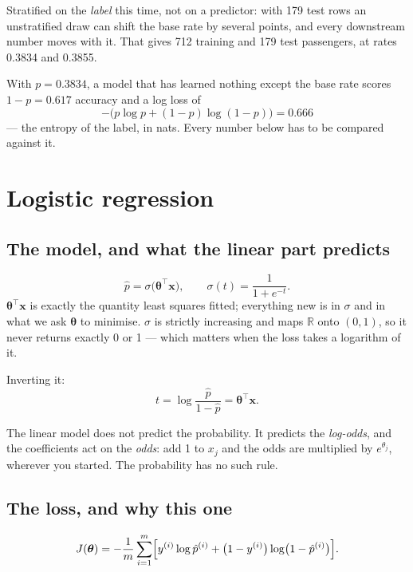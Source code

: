 \documentclass[11pt,a4paper]{article}
\begin{document}
Stratified on the \emph{label} this time, not on a predictor: with 179 test
rows an unstratified draw can shift the base rate by several points, and every
downstream number moves with it. That gives 712 training and 179 test
passengers, at rates 0.3834 and 0.3855.

With $p = 0.3834$, a model that has learned nothing except the base rate scores
$1 - p = 0.617$ accuracy and a log loss of
\[ -\bigl(p\log p + (1-p)\log(1-p)\bigr) = 0.666 \]
--- the entropy of the label, in nats. Every number below has to be compared
against it.

\section{Logistic regression}

\subsection{The model, and what the linear part predicts}

\[ \hat p = \sigma\bigl(\boldsymbol\theta^{\intercal}\mathbf{x}\bigr),
   \qquad \sigma(t) = \frac{1}{1 + e^{-t}}. \]
$\boldsymbol\theta^{\intercal}\mathbf{x}$ is exactly the quantity least squares
fitted; everything new is in $\sigma$ and in what we ask $\boldsymbol\theta$ to
minimise. $\sigma$ is strictly increasing and maps $\mathbb{R}$ onto $(0,1)$,
so it never returns exactly 0 or 1 --- which matters when the loss takes a
logarithm of it.

Inverting it:
\[ t = \log\frac{\hat p}{1-\hat p}
     = \boldsymbol\theta^{\intercal}\mathbf{x}. \]

\begin{keybox}[title={The sentence most often got wrong in the examination}]
The linear model does not predict the probability. It predicts the
\emph{log-odds}, and the coefficients act on the \emph{odds}: add 1 to $x_j$
and the odds are multiplied by $e^{\theta_j}$, wherever you started. The
probability has no such rule.
\end{keybox}

\subsection{The loss, and why this one}

\[ J(\boldsymbol\theta) = -\frac{1}{m}\sum_{i=1}^{m}
   \Bigl[y^{(i)}\log\hat p^{(i)}
        + \bigl(1-y^{(i)}\bigr)\log\bigl(1-\hat p^{(i)}\bigr)\Bigr]. \]
\end{document}
